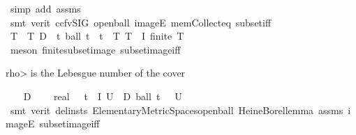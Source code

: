 \begin{isabellebody}
\ {\isacharparenleft}{\kern0pt}simp\ add{\isacharcolon}{\kern0pt}\ assms{\isacharparenleft}{\kern0pt}{}{\isacharparenright}{\kern0pt}{\isacharparenright}{\kern0pt}\isanewline
\ \ \ \ \isamarkupfalse%
\ {\isacharparenleft}{\kern0pt}smt\ {\isacharparenleft}{\kern0pt}verit{\isacharcomma}{\kern0pt}\ ccfv{\isacharunderscore}{\kern0pt}SIG{\isacharparenright}{\kern0pt}\ open{\isacharunderscore}{\kern0pt}ball\ imageE\ mem{\isacharunderscore}{\kern0pt}Collect{\isacharunderscore}{\kern0pt}eq\ subset{\isacharunderscore}{\kern0pt}iff{\isacharparenright}{\kern0pt}\isanewline
\ \ \isamarkupfalse%
\ \isamarkupfalse%
\ T\ \ T{\isacharcolon}{\kern0pt}\ {\isachardoublequoteopen}D\ {\isacharequal}{\kern0pt}\ {\isacharparenleft}{\kern0pt}{\isasymlambda}t{\isachardot}{\kern0pt}\ ball\ t\ {\isacharparenleft}{\kern0pt}{\isasymepsilon}\ t{\isacharparenright}{\kern0pt}{\isacharparenright}{\kern0pt}\ {\isacharbackquote}{\kern0pt}\ T{\isachardoublequoteclose}\ {\isachardoublequoteopen}T\ {\isasymsubseteq}\ I{\isachardoublequoteclose}\ {\isachardoublequoteopen}finite\ T{\isachardoublequoteclose}\isanewline
\ \ \ \ \isamarkupfalse%
\ {\isacharparenleft}{\kern0pt}meson\ finite{\isacharunderscore}{\kern0pt}subset{\isacharunderscore}{\kern0pt}image\ subset{\isacharunderscore}{\kern0pt}image{\isacharunderscore}{\kern0pt}iff{\isacharparenright}{\kern0pt}%
\begin{isamarkuptext}%
\<rho> is the Lebesgue number of the cover%
\end{isamarkuptext}\isamarkuptrue%
\ \ \isamarkupfalse%
\ D\ \isamarkupfalse%
\ {\isasymrho}\ {\isacharcolon}{\kern0pt}{\isacharcolon}{\kern0pt}\ real\ \ {\isasymrho}{\isacharcolon}{\kern0pt}\ {\isachardoublequoteopen}{\isasymforall}t\ {\isasymin}\ I{\isachardot}{\kern0pt}\ {\isasymexists}U\ {\isasymin}\ D{\isachardot}{\kern0pt}\ ball\ t\ {\isasymrho}\ {\isasymsubseteq}\ U{\isachardoublequoteclose}\ {\isachardoublequoteopen}{\isasymrho}\ {\isachargreater}{\kern0pt}\ {}{\isachardoublequoteclose}\isanewline
\ \ \ \ \isamarkupfalse%
\ {\isacharparenleft}{\kern0pt}smt\ {\isacharparenleft}{\kern0pt}verit{\isacharcomma}{\kern0pt}\ del{\isacharunderscore}{\kern0pt}insts{\isacharparenright}{\kern0pt}\ Elementary{\isacharunderscore}{\kern0pt}Metric{\isacharunderscore}{\kern0pt}Spaces{\isachardot}{\kern0pt}open{\isacharunderscore}{\kern0pt}ball\ Heine{\isacharunderscore}{\kern0pt}Borel{\isacharunderscore}{\kern0pt}lemma\ assms{\isacharparenleft}{\kern0pt}{}{\isacharparenright}{\kern0pt}\ imageE\ subset{\isacharunderscore}{\kern0pt}image{\isacharunderscore}{\kern0pt}iff{\isacharparenright}{\kern0pt}\isanewline

\end{isabellebody}

